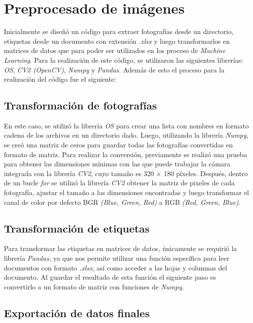 \section{Preprocesado de imágenes}
Inicialmente se diseñó un código para extraer fotografías desde un directorio, etiquetas desde un documento con extensión \textit{.xlsx} y luego transformarlos en matrices de datos que para poder ser utilizados en los proceso de \textit{Machine Learning}. Para la realización de este código, se utilizaron las siguientes librerías: \textit{OS}, \textit{CV2 (OpenCV)}, \textit{Numpy} y \textit{Pandas}. Además de esto el proceso para la realización del código fue el siguiente: 

\subsection{Transformación de fotografías}
En este caso, se utilizó la librería \textit{OS} para crear una lista con nombres en formato cadena de los archivos en un directorio dado. Luego, utilizando la librería \textit{Numpy}, se creó una matriz de ceros para guardar todas las fotografías convertidas en formato de matriz. Para realizar la conversión, previamente se realizó una prueba para obtener las dimensiones mínimas con las que puede trabajar la cámara integrada con la librería \textit{CV2}, cuyo tamaño es 320 $\times$ 180 píxeles. Después, dentro de un bucle \textit{for} se utilizó la librería \textit{CV2} obtener la matriz de pixeles de cada fotografía, ajustar el tamaño a las dimensiones encontradas y luego transformar el canal de color por defecto BGR \textit{(Blue, Green, Red)} a RGB \textit{(Red, Green, Blue)}. 

\subsection{Transformación de etiquetas}

Para transformar las etiquetas en matrices de datos, únicamente se requirió la librería \textit{Pandas}, ya que nos permite utilizar una función específica para leer documentos con formato \textit{.xlsx}, así como acceder a las hojas y columnas del documento. Al guardar el resultado de esta función el siguiente paso es convertirlo a un formato de matriz con funciones de \textit{Numpy}. 

\subsection{Exportación de datos finales}

